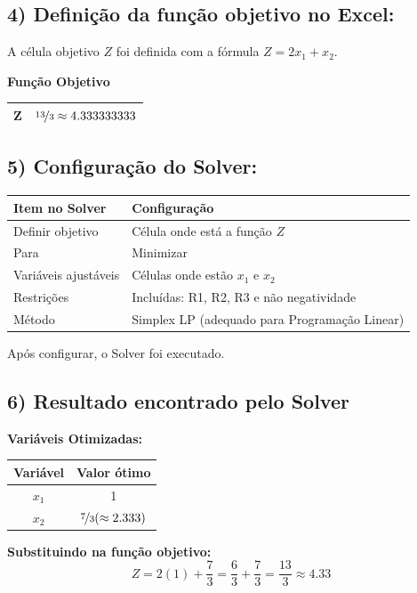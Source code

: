\documentclass[12pt, a4paper]{article}
\begin{document}
\subsection*{4) Definição da função objetivo no Excel:}
A célula objetivo $Z$ foi definida com a fórmula $Z = 2x_1 + x_2$.

\textbf{Função Objetivo}
\begin{center}
\begin{tabular}{|c|c|}
\hline
$\mathbf{Z}$ & $\nicefrac{13}{3} \approx 4.333333333$ \\
\hline
\end{tabular}
\end{center}

\subsection*{5) Configuração do Solver:}
\begin{center}
\begin{tabular}{ll}
\toprule
\textbf{Item no Solver} & \textbf{Configuração} \\
\midrule
Definir objetivo & Célula onde está a função $Z$ \\
Para & Minimizar \\
Variáveis ajustáveis & Células onde estão $x_1$ e $x_2$ \\
Restrições & Incluídas: R1, R2, R3 e não negatividade \\
Método & Simplex LP (adequado para Programação Linear) \\
\bottomrule
\end{tabular}
\end{center}
Após configurar, o Solver foi executado.

\subsection*{6) Resultado encontrado pelo Solver}
\textbf{Variáveis Otimizadas:}
\begin{center}
\begin{tabular}{c|c}
\hline
\textbf{Variável} & \textbf{Valor ótimo} \\
\hline
$x_1$ & 1 \\
$x_2$ & $\nicefrac{7}{3} (\approx 2.333)$ \\
\hline
\end{tabular}
\end{center}

\textbf{Substituindo na função objetivo:}
$$Z = 2(1) + \frac{7}{3} = \frac{6}{3} + \frac{7}{3} = \frac{13}{3} \approx 4.33$$
\end{document}

